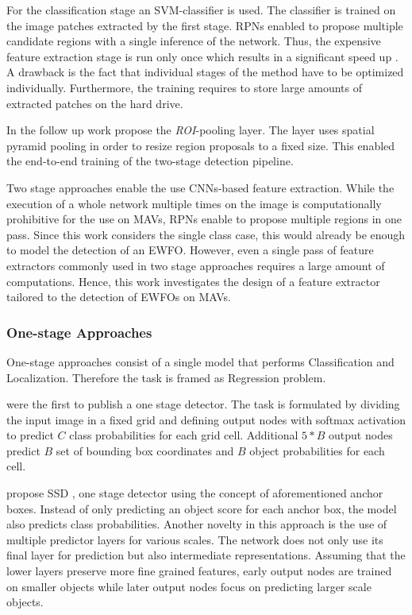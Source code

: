 For the classification stage an \ac{SVM}-classifier is used. The classifier is trained on the image patches extracted by the first stage. \acp{RPN} enabled to propose multiple candidate regions with a single inference of the network. Thus, the expensive feature extraction stage is run only once which results in a significant speed up . A drawback is the fact that individual stages of the method have to be optimized individually. Furthermore, the training requires to store large amounts of extracted patches on the hard drive.

In the follow up work \cite{Ren} propose the \textit{ROI}-pooling layer. The layer uses spatial pyramid pooling in order to resize region proposals to a fixed size. This enabled the end-to-end training of the two-stage detection pipeline. 
	
Two stage approaches enable the use \acp{CNN}-based feature extraction. While the execution of a whole network multiple times on the image is computationally prohibitive for the use on \acp{MAV}, \acp{RPN} enable to propose multiple regions in one pass. Since this work considers the single class case, this would already be enough to model the detection of an \ac{EWFO}. However, even a single pass of feature extractors commonly used in two stage approaches requires a large amount of computations. Hence, this work investigates the design of a feature extractor tailored to the detection of \acp{EWFO} on \acp{MAV}.
	
\subsubsection{One-stage Approaches}

One-stage approaches consist of a single model that performs Classification and Localization. Therefore the task is framed as Regression problem.

\citeauthor{Redmon} \cite{Redmon} were the first to publish a one stage detector. The task is formulated by dividing the input image in a fixed grid and defining output nodes with softmax activation to predict $C$ class probabilities for each grid cell. Additional $5*B$ output nodes predict $B$ set of bounding box coordinates and $B$ object probabilities for each cell. 

\citeauthor{Liu} propose \ac{SSD} \cite{Liu}, one stage detector using the concept of aforementioned anchor boxes. Instead of only predicting an object score for each anchor box, the model also predicts class probabilities. Another novelty in this approach is the use of multiple predictor layers for various scales. The network does not only use its final layer for prediction but also intermediate representations. Assuming that the lower layers preserve more fine grained features, early output nodes are trained on smaller objects while later output nodes focus on predicting larger scale objects.

